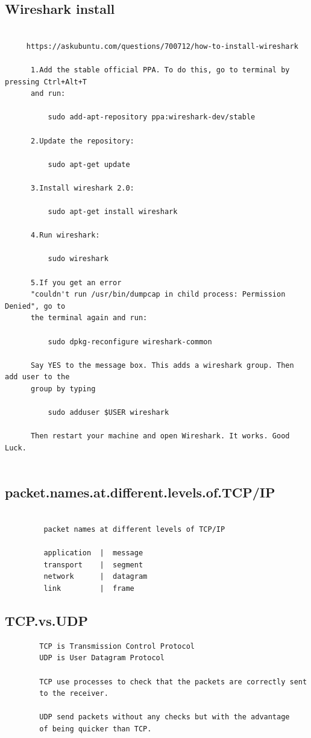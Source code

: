 \documentclass[a4paper,12pt]{article}
\begin{document}
\subsection{Wireshark install}
\begin{verbatim}

     https://askubuntu.com/questions/700712/how-to-install-wireshark
     
      1.Add the stable official PPA. To do this, go to terminal by pressing Ctrl+Alt+T
      and run:

          sudo add-apt-repository ppa:wireshark-dev/stable

      2.Update the repository:

          sudo apt-get update

      3.Install wireshark 2.0:

          sudo apt-get install wireshark

      4.Run wireshark:

          sudo wireshark
          
      5.If you get an error 
      "couldn't run /usr/bin/dumpcap in child process: Permission Denied", go to 
      the terminal again and run:

          sudo dpkg-reconfigure wireshark-common
          
      Say YES to the message box. This adds a wireshark group. Then add user to the
      group by typing

          sudo adduser $USER wireshark
          
      Then restart your machine and open Wireshark. It works. Good Luck.
     
\end{verbatim}     


\subsection{packet.names.at.different.levels.of.TCP/IP}
\begin{verbatim}
         
         packet names at different levels of TCP/IP
         
         application  |  message
         transport    |  segment
         network      |  datagram
         link         |  frame
\end{verbatim}

\subsection{TCP.vs.UDP}
\begin{verbatim}
        TCP is Transmission Control Protocol
        UDP is User Datagram Protocol
        
        TCP use processes to check that the packets are correctly sent
        to the receiver.
        
        UDP send packets without any checks but with the advantage
        of being quicker than TCP. 

\end{verbatim}
\end{document}
